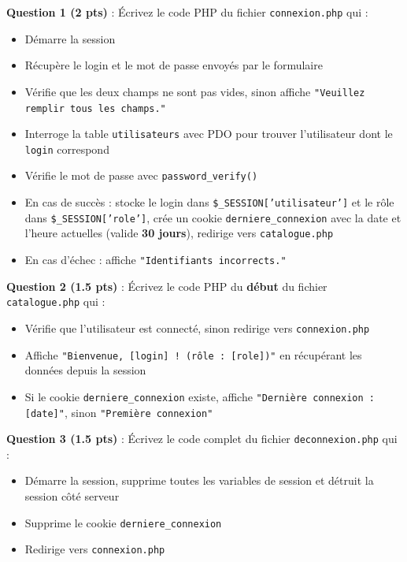 \documentclass[11pt,a4paper]{article}
\newcommand{\answerbox}[1]{%
  \begin{mdframed}[
    linecolor=answerframe,
    linewidth=0.5pt,
    backgroundcolor=answerbg,
    innertopmargin=6pt,
    innerbottommargin=#1,
    innerleftmargin=6pt,
    innerrightmargin=6pt,
    skipabove=4pt,
    skipbelow=6pt,
  ]
  \phantom{x}
  \end{mdframed}
}
\begin{document}
\noindent\textbf{Question 1 (2 pts)} : Écrivez le code PHP du fichier \texttt{connexion.php} qui :
\begin{itemize}[itemsep=1pt, topsep=2pt]
  \item Démarre la session
  \item Récupère le login et le mot de passe envoyés par le formulaire
  \item Vérifie que les deux champs ne sont pas vides, sinon affiche \texttt{"Veuillez remplir tous les champs."}
  \item Interroge la table \texttt{utilisateurs} avec PDO pour trouver l'utilisateur dont le \texttt{login} correspond
  \item Vérifie le mot de passe avec \texttt{password\_verify()}
  \item En cas de succès : stocke le login dans \texttt{\$\_SESSION['utilisateur']} et le rôle dans \texttt{\$\_SESSION['role']}, crée un cookie \texttt{derniere\_connexion} avec la date et l'heure actuelles (valide \textbf{30 jours}), redirige vers \texttt{catalogue.php}
  \item En cas d'échec : affiche \texttt{"Identifiants incorrects."}
\end{itemize}

\answerbox{130pt}

\noindent\textbf{Question 2 (1.5 pts)} : Écrivez le code PHP du \textbf{début} du fichier \texttt{catalogue.php} qui :
\begin{itemize}[itemsep=1pt, topsep=2pt]
  \item Vérifie que l'utilisateur est connecté, sinon redirige vers \texttt{connexion.php}
  \item Affiche \texttt{"Bienvenue, [login] ! (rôle : [role])"} en récupérant les données depuis la session
  \item Si le cookie \texttt{derniere\_connexion} existe, affiche \texttt{"Dernière connexion : [date]"}, sinon \texttt{"Première connexion"}
\end{itemize}

\answerbox{90pt}

\noindent\textbf{Question 3 (1.5 pts)} : Écrivez le code complet du fichier \texttt{deconnexion.php} qui :
\begin{itemize}[itemsep=1pt, topsep=2pt]
  \item Démarre la session, supprime toutes les variables de session et détruit la session côté serveur
  \item Supprime le cookie \texttt{derniere\_connexion}
  \item Redirige vers \texttt{connexion.php}
\end{itemize}
\end{document}
